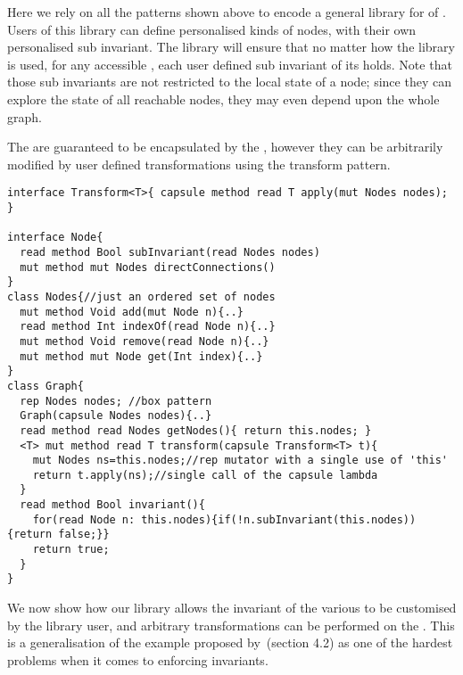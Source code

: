 

Here we rely on all the patterns shown above to encode a general library for \Q@Graph@s
of \Q@Node@s.
Users of this library can define personalised kinds of nodes,
with their own personalised sub invariant.
The library will ensure that no matter how the library is used, for any accessible \Q@Graph@, each user defined sub invariant of its \Q@Node@s holds.
Note that those sub invariants are not restricted to the local state of a node; since they can explore the state of all reachable nodes, they may even depend upon the whole graph.

The \Q@Node@s are guaranteed to be encapsulated by the \Q@Graph@, however they can be arbitrarily modified by user defined transformations using the transform pattern.
\begin{lstlisting}
interface Transform<T>{ capsule method read T apply(mut Nodes nodes); }

interface Node{
  read method Bool subInvariant(read Nodes nodes)
  mut method mut Nodes directConnections()
}
class Nodes{//just an ordered set of nodes 
  mut method Void add(mut Node n){..}
  read method Int indexOf(read Node n){..}
  mut method Void remove(read Node n){..}
  mut method mut Node get(Int index){..}
}
class Graph{ 
  rep Nodes nodes; //box pattern
  Graph(capsule Nodes nodes){..}
  read method read Nodes getNodes(){ return this.nodes; }
  <T> mut method read T transform(capsule Transform<T> t){
    mut Nodes ns=this.nodes;//rep mutator with a single use of 'this'
    return t.apply(ns);//single call of the capsule lambda
  }
  read method Bool invariant(){
    for(read Node n: this.nodes){if(!n.subInvariant(this.nodes)){return false;}}
    return true;
  }
}
\end{lstlisting}
We now show how our \Q@Graph@ library allows the invariant of the various \Q@Node@s to be customised by the library user, and arbitrary transformations can be performed on the \Q@Graph@s. This is a generalisation of the example proposed by~\cite{Summers:2009:NFO:1562154.1562160}(section 4.2) as one of the hardest problems when it comes to enforcing invariants.

